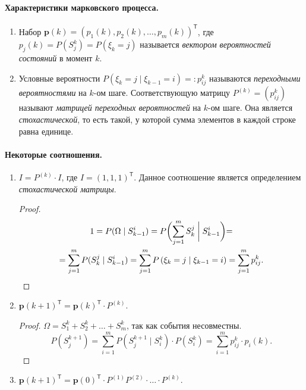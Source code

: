 \paragraph{Характеристики марковского процесса.}
\begin{enumerate}
  \item Набор $\mathbf{p}(k) = \left( p_1 (k), p_2(k), \dots, p_m(k)\right)^{\mathsf T} $,
    где $p_j(k) = P(S_j^k) = P(\xi_k = j)$ называется \emph{вектором
    вероятностей состояний} в
    момент $ k $.

  \item Условные вероятности $P(\xi_k = j \mid \xi_{k-1} = i) =: p_{ij}^{k}$
    называются \emph{переходными вероятностями} на $k$-ом шаге.
    Соответствующую матрицу $P^{(k)} = (p_{ij}^k)$ называют \emph{матрицей переходных
  вероятностей} на $k$-ом шаге. Она является
    \emph{стохастической}, то есть такой, у которой сумма элементов в каждой строке равна
    единице.
\end{enumerate}

\paragraph{Некоторые соотношения.}
\begin{enumerate}
  \item $I = P^{(k)} \cdot I$, где $I = \left( 1 , 1 , 1 \right)^{\mathsf T} $. 
    Данное соотношение является определением \emph{стохастической матрицы}.
    \begin{proof}
      \begin{multline*}
        1 = P(\Omega \mid S_{k-1}^i) = P\biggl(\sum_{j=1}^m S_k^j \biggm|
          S_{k-1}^i\biggl)
        = \\ =
        \sum_{j=1}^m P(S_k^j \mid S_{k-1}^i)
        = \sum_{j=1}^m P\left(\xi_k = j \mid \xi_{k-1}=i\right) = \sum_{j=1}^m p_{ij}^k.
      \end{multline*}
    \end{proof}

  \item $\mathbf{p} (k+1) ^{\mathsf T} = \mathbf{p}(k)^{\mathsf T} \cdot P^{(k)}$.
    \begin{proof}
      $\Omega = S_1^k + S_2^k + \ldots + S_m^k$, так как события несовместны.
    \[
      P(S_j^{k+1}) = \sum_{i=1}^m P(S_j^{k+1} \mid S_i^k) \cdot P(S_i^k)
      = \sum_{i=1}^m p_{ij}^k \cdot p_i(k).
    \]
    \end{proof}

  \item $\mathbf{p} (k+1)^{\mathsf T} = \mathbf{p}(0)^{\mathsf T} \cdot P^{(1)} P^{(2)} \cdot \ldots \cdot P^{(k)}$.
\end{enumerate}


